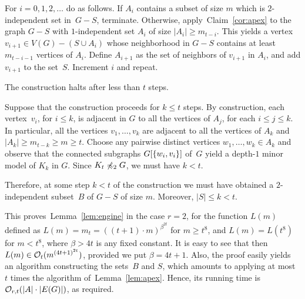 For $i=0,1,2,\ldots$ do as follows.  If $A_{i}$ contains a subset of
size $m$ which is $2$-independent set in~$G-S$, terminate.  Otherwise,
apply~Claim~\ref{cor:apex} to the graph $G-S$ with $1$-independent set
$A_{i}$ of size $|A_i|\ge m_{t-i}$. This yields a vertex
$v_{i+1}\in V(G)-(S\cup A_i)$ whose neighborhood in $G-S$ contains at
least $m_{t-i-1}$ vertices of $A_{i}$.  Define $A_{i+1}$ as the set of
neighbors of $v_{i+1}$ in $A_i$, and add $v_{i+1}$ to the set~$S$.
Increment $i$ and repeat.

\begin{claim}\label{claim:at-most-t}
  The construction halts after less than $t$ steps.
\end{claim}
\begin{clproof}
  Suppose that the construction proceeds for $k\le t$ steps.  By
  construction, each vertex~$v_i$, for $i\le k$, is adjacent in $G$ to
  all the vertices of $A_{j}$, for each $i\le j\le k$. In particular,
  all the vertices $v_1,\ldots,v_k$ are adjacent to all the vertices
  of $A_{k}$ and $|A_k|\ge m_{t-k}\ge m\ge t$.  Choose any pairwise
  distinct vertices $w_1,\ldots,w_k\in A_k$ and observe that the
  connected subgraphs $G[\{w_i,v_i\}]$ of~$G$ yield a depth-$1$
  minor model of $K_k$ in $G$.  Since $K_t\not\preccurlyeq_2 G$, we must
  have $k<t$.
 \end{clproof}
 
 Therefore, at some step $k<t$ of the construction we must have
 obtained a $2$-independent subset~$B$ of $G-S$ of size $m$. Moreover,
 $|S|\le k<t$.
 
 
 
 This proves~Lemma~\ref{lem:engine} in the case $r=2$, for the
 function $L(m)$ defined as $L(m)=m_t=((t+1)\cdot m)^{\beta^{2t}}$ for
 $m\ge t^8$, and $L(m)=L(t^8)$ for $m<t^8$, where $\beta>4t$ is any
 fixed constant.  It is easy to see that then
 $L(m)\in \mathcal{O}_{t}{(m^{{(4t+1)}^{2t}})}$, provided we put
 $\beta=4t+1$.  Also, the proof easily yields an algorithm
 constructing the sets~$B$ and $S$, which amounts to applying at most
 $t$ times the algorithm of~Lemma~\ref{lem:apex}.  Hence, its running
 time is $\mathcal{O}_{r,t}(|A|\cdot |E(G)|)$, as required.


